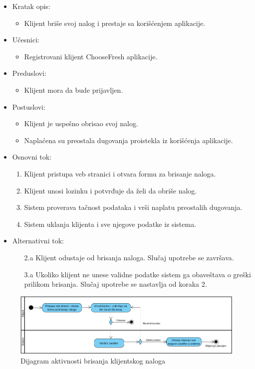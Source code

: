 
\begin{itemize}
    \item Kratak opis:
        \begin{itemize}
            \item Klijent briše svoj nalog i prestaje sa korišćenjem aplikacije.
        \end{itemize}
    \item Učesnici:
        \begin{itemize}
            \item Registrovani klijent ChooseFresh aplikacije.
        \end{itemize}
    \item Preduslovi:
        \begin{itemize}
            \item Klijent mora da bude prijavljen.
        \end{itemize}
    \item Postuslovi:
        \begin{itemize}
            \item Klijent je uspešno obrisao svoj nalog.
            \item Naplaćena su preostala dugovanja proistekla iz korišćenja aplikacije.
        \end{itemize}
    \item Osnovni tok:
        \begin{enumerate}
            \item Klijent pristupa veb stranici i otvara formu za brisanje naloga.
            \item Klijent unosi lozinku i potvrđuje da želi da obriše nalog.
            \item Sistem proverava tačnost podataka i vrši naplatu preostalih dugovanja.
            \item Sistem uklanja klijenta i sve njegove podatke iz sistema.
        \end{enumerate}
    \item Alternativni tok:
        \begin{itemize}
            \item[2.a] Klijent odustaje od brisanja naloga. Slučaj upotrebe se završava.
			\item[3.a] Ukoliko klijent ne unese validne podatke sistem ga obaveštava o greški prilikom brisanja. Slučaj upotrebe se nastavlja od koraka 2.
        \end{itemize}
\end{itemize}

\begin{figure}[H]
\begin{center}
\includegraphics[width=\textwidth]{Pictures/activity_client_delete.png}
\end{center}
    \caption{Dijagram aktivnosti brisanja klijentskog naloga}
\label{fig:ActivityClientDelete}
\end{figure}
